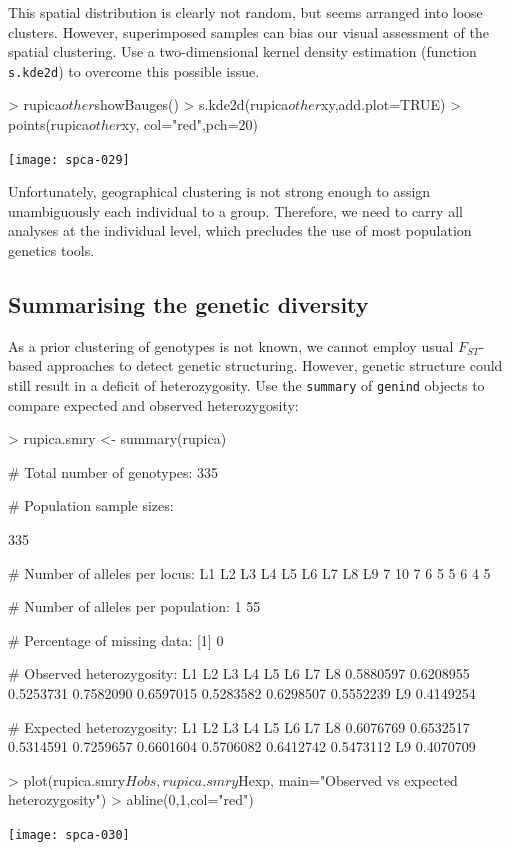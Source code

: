 \documentclass{article}
\begin{document}
\noindent This spatial distribution is clearly not random, but seems arranged into
loose clusters.
However, superimposed samples can bias our visual assessment of the spatial clustering.
Use a two-dimensional kernel density estimation (function \texttt{s.kde2d}) to overcome this possible
issue.
\begin{Schunk}
\begin{Sinput}
> rupica$other$showBauges()
> s.kde2d(rupica$other$xy,add.plot=TRUE)
> points(rupica$other$xy, col="red",pch=20)
\end{Sinput}
\end{Schunk}
\texttt{[image: spca-029]}

Unfortunately, geographical clustering is not strong enough to assign unambiguously each individual to a group.
Therefore, we need to carry all analyses at the individual level, which precludes the use of most
population genetics tools.




\subsection{Summarising the genetic diversity}
As a prior clustering of genotypes is not known, we cannot employ usual
$F_{ST}$-based approaches to detect genetic structuring.
However, genetic structure could still result in a deficit of
heterozygosity.
Use the \texttt{summary} of \texttt{genind} objects to compare expected and
observed heterozygosity:
\begin{Schunk}
\begin{Sinput}
> rupica.smry <- summary(rupica)
\end{Sinput}
\begin{Soutput}
 # Total number of genotypes:  335 

 # Population sample sizes:  
    
335 

 # Number of alleles per locus:  
L1 L2 L3 L4 L5 L6 L7 L8 L9 
 7 10  7  6  5  5  6  4  5 

 # Number of alleles per population:  
 1 
55 

 # Percentage of missing data:  
[1] 0

 # Observed heterozygosity:  
       L1        L2        L3        L4        L5        L6        L7        L8 
0.5880597 0.6208955 0.5253731 0.7582090 0.6597015 0.5283582 0.6298507 0.5552239 
       L9 
0.4149254 

 # Expected heterozygosity:  
       L1        L2        L3        L4        L5        L6        L7        L8 
0.6076769 0.6532517 0.5314591 0.7259657 0.6601604 0.5706082 0.6412742 0.5473112 
       L9 
0.4070709 
\end{Soutput}
\begin{Sinput}
> plot(rupica.smry$Hobs, rupica.smry$Hexp, main="Observed vs expected heterozygosity")
> abline(0,1,col="red")
\end{Sinput}
\end{Schunk}
\texttt{[image: spca-030]}
\end{document}
